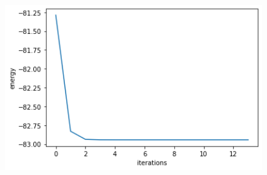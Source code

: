 \documentclass{beamer}
\begin{document}
\begin{frame}
    \begin{figure}
        \includegraphics[width=1\textwidth]{convergence.png}
    \end{figure}
\end{frame}
\end{document}
